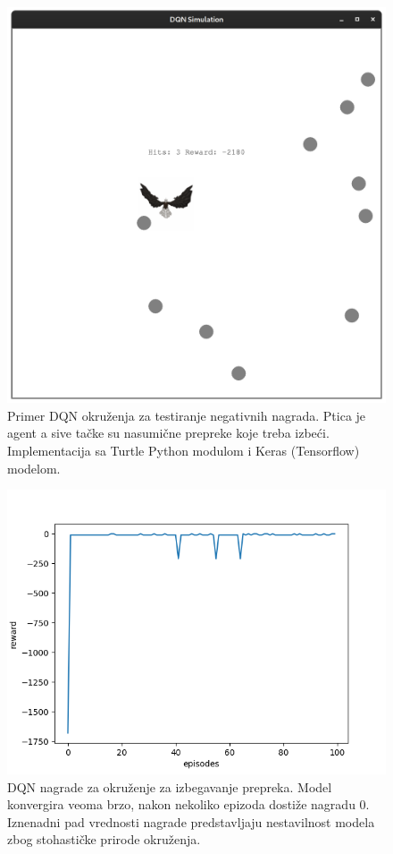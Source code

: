 \begin{figure}[!ht]
  \centering
  \includegraphics[scale=0.1]{figures/dqn_bird.png} 
  {\vskip 0cm Primer DQN okruženja za testiranje negativnih nagrada. Ptica je agent a sive tačke su nasumične prepreke koje treba izbeći. Implementacija sa Turtle Python modulom i Keras (Tensorflow) modelom.}
\end{figure}

\begin{figure}[!ht]
  \centering
  \includegraphics[scale=0.65]{figures/dqn_results.png} 
  {\vskip 0cm DQN nagrade za okruženje za izbegavanje prepreka. Model konvergira veoma brzo, nakon nekoliko epizoda dostiže nagradu $ 0 $. Iznenadni pad vrednosti nagrade predstavljaju nestavilnost modela zbog stohastičke prirode okruženja.}
\end{figure}

